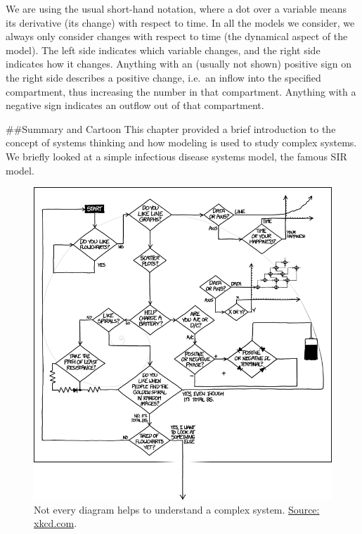 \documentclass[]{book}
\theoremstyle{definition}
\theoremstyle{definition}
\theoremstyle{definition}
\theoremstyle{remark}
\begin{document}
We are using the usual short-hand notation, where a dot over a variable
means its derivative (its change) with respect to time. In all the
models we consider, we always only consider changes with respect to time
(the dynamical aspect of the model). The left side indicates which
variable changes, and the right side indicates how it changes. Anything
with an (usually not shown) positive sign on the right side describes a
positive change, i.e.~an inflow into the specified compartment, thus
increasing the number in that compartment. Anything with a negative sign
indicates an outflow out of that compartment.

\#\#Summary and Cartoon This chapter provided a brief introduction to
the concept of systems thinking and how modeling is used to study
complex systems. We briefly looked at a simple infectious disease
systems model, the famous SIR model.

\begin{figure}
\centering
\includegraphics{./images/xkcd-flowcharts.png}
\caption{\label{fig:complexcartoon}Not every diagram helps to understand a
complex system. \href{https://xkcd.com/1488/}{Source: xkcd.com}.}
\end{figure}
\end{document}
